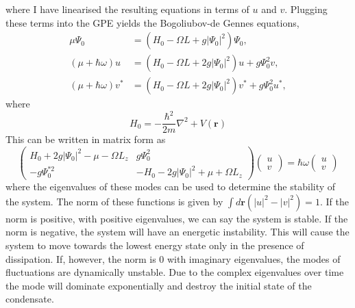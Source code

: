 where I have linearised the resulting equations in terms of $u$ and $v$. Plugging these terms into the GPE yields the Bogoliubov-de Gennes equations,
\begin{subequations}\label{eqn:bogo_lhsrhs}
\begin{align}
    \mu \Psi_0 &= (H_0 - \Omega L + g |\Psi_0|^2)\Psi_0,\\
    (\mu +\hbar\omega)u &= (H_0 - \Omega L + 2g|\Psi_0|^2)u + g\Psi_0^2 v,\\
    (\mu +\hbar\omega)v^{*} &= (H_0 - \Omega L + 2g|\Psi_0|^2)v^{*} + g\Psi_0^2 u^{*},
\end{align}
\end{subequations}
where
\begin{equation}\label{eqn:bogo_h0}
H_0 = -\frac{\hbar^2}{2m}\nabla^2 + V(\mathbf{r})
\end{equation}
This can be written in matrix form as
\begin{equation}
    \begin{pmatrix}
        H_0 + 2g|\Psi_0|^2- \mu -\Omega L_z & g\Psi_0^2 \\
        -g\Psi_0^{*2} & -H_0 - 2g|\Psi_0|^2 + \mu +\Omega L_z
    \end{pmatrix}
    \begin{pmatrix}
        u \\
        v
    \end{pmatrix}
    = \hbar\omega
    \begin{pmatrix}
        u \\
        v
    \end{pmatrix}
\end{equation}
where the eigenvalues of these modes can be used to determine the stability of the system. The norm of these functions is given by $\int d\mathbf{r}(|u|^2 - |v|^2)=1$. If the norm is positive, with positive eigenvalues, we can say the system is stable. If the norm is negative, the system will have an energetic instability. This will cause the system to move towards the lowest energy state only in the presence of dissipation. If, however, the norm is 0 with imaginary eigenvalues, the modes of fluctuations are dynamically unstable. Due to the complex eigenvalues over time the mode will dominate exponentially and destroy the initial state of the condensate. %

